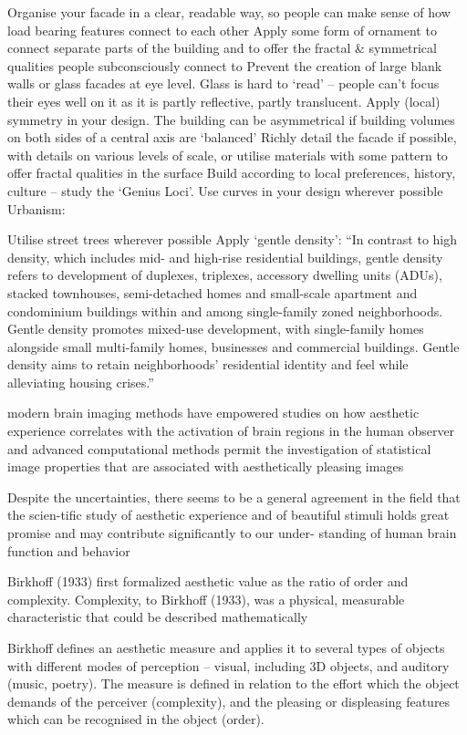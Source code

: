 Organise your facade in a clear, readable way, so people can make sense of how load bearing features connect to each other
Apply some form of ornament to connect separate parts of the building and to offer the fractal & symmetrical qualities people subconsciously connect to
Prevent the creation of large blank walls or glass facades at eye level. Glass is hard to ‘read’ – people can’t focus their eyes well on it as it is partly reflective, partly translucent.
Apply (local) symmetry in your design. The building can be asymmetrical if building volumes on both sides of a central axis are ‘balanced’
Richly detail the facade if possible, with details on various levels of scale, or utilise materials with some pattern to offer fractal qualities in the surface
Build according to local preferences, history, culture – study the ‘Genius Loci’.
Use curves in your design wherever possible
Urbanism:

Utilise street trees wherever possible
Apply ‘gentle density’: “In contrast to high density, which includes mid- and high-rise residential buildings, gentle density refers to development of duplexes, triplexes, accessory dwelling units (ADUs), stacked townhouses, semi-detached homes and small-scale apartment and condominium buildings within and among single-family zoned neighborhoods. Gentle density promotes mixed-use development, with single-family homes alongside small multi-family homes, businesses and commercial buildings. Gentle density aims to retain neighborhoods’ residential identity and feel while alleviating housing crises.”

modern brain imaging methods have empowered studies on how aesthetic experience
correlates with the activation of brain regions in the human
observer and advanced computational methods permit the investigation of statistical
image properties that are associated with aesthetically pleasing images\cite{Redies2015}

Despite the uncertainties, there seems to be a general agreement in the ﬁeld that the scien-tiﬁc study of aesthetic experience and of beautiful stimuli holds
great promise and may contribute signiﬁcantly to our under-
standing of human brain function and behavior\cite{Redies2015}

Birkhoff (1933)\cite{Birkhoff1933} first formalized aesthetic value as the ratio of order and complexity.
Complexity, to Birkhoff (1933), was a
physical, measurable characteristic that could be described
mathematically \cite{Bies2016}

Birkhoff\cite{Birkhoff1933} defines an aesthetic measure and applies it to several types of objects with different modes of perception – visual, including
3D objects, and auditory (music, poetry).
The measure is defined in relation to the effort which the object demands of the perceiver (complexity), and the pleasing or displeasing features which can be recognised in the object (order).\cite{Douchova2016}

